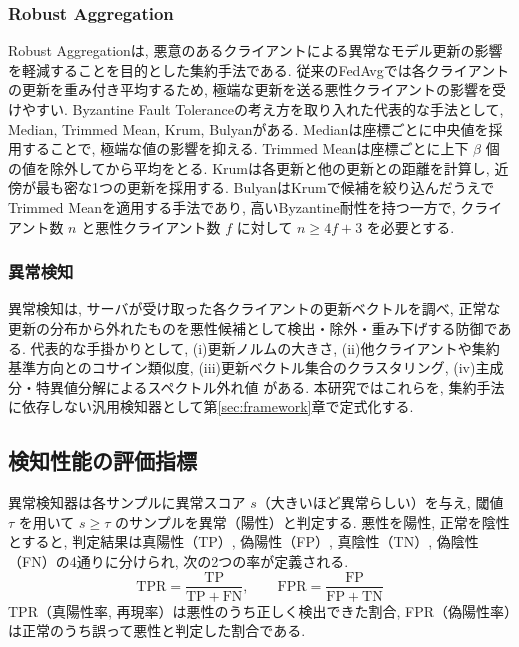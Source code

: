 \documentclass[a4j, twocolumn, dvipdfmx]{jsarticle}
\begin{document}
\subsubsection{Robust Aggregation}
Robust Aggregationは, 悪意のあるクライアントによる異常なモデル更新の影響を軽減することを目的とした集約手法である. 従来のFedAvgでは各クライアントの更新を重み付き平均するため, 極端な更新を送る悪性クライアントの影響を受けやすい. Byzantine Fault Toleranceの考え方を取り入れた代表的な手法として, Median, Trimmed Mean, Krum, Bulyanがある. Median\cite{yin2018byzantine}は座標ごとに中央値を採用することで, 極端な値の影響を抑える. Trimmed Mean\cite{yin2018byzantine}は座標ごとに上下 $\beta$ 個の値を除外してから平均をとる. Krum\cite{blanchard2017krum}は各更新と他の更新との距離を計算し, 近傍が最も密な1つの更新を採用する. Bulyan\cite{elmhamdi2018hidden}はKrumで候補を絞り込んだうえでTrimmed Meanを適用する手法であり, 高いByzantine耐性を持つ一方で, クライアント数 $n$ と悪性クライアント数 $f$ に対して $n \geq 4f+3$ を必要とする.

\subsubsection{異常検知}
異常検知は, サーバが受け取った各クライアントの更新ベクトルを調べ, 正常な更新の分布から外れたものを悪性候補として検出・除外・重み下げする防御である. 代表的な手掛かりとして, (i)更新ノルムの大きさ\cite{nguyen2022flame}, (ii)他クライアントや集約基準方向とのコサイン類似度\cite{nguyen2022flame}, (iii)更新ベクトル集合のクラスタリング\cite{shen2016auror}, (iv)主成分・特異値分解によるスペクトル外れ値\cite{tran2018spectral,shejwalkar2021manipulating} がある. 本研究ではこれらを, 集約手法に依存しない汎用検知器として第\ref{sec:framework}章で定式化する.

\subsection{検知性能の評価指標}
\label{sec:roc-auc}

異常検知器は各サンプルに異常スコア $s$（大きいほど異常らしい）を与え, 閾値 $\tau$ を用いて $s \geq \tau$ のサンプルを異常（陽性）と判定する. 悪性を陽性, 正常を陰性とすると, 判定結果は真陽性（TP）, 偽陽性（FP）, 真陰性（TN）, 偽陰性（FN）の4通りに分けられ, 次の2つの率が定義される.
\begin{equation}
\mathrm{TPR} = \frac{\mathrm{TP}}{\mathrm{TP}+\mathrm{FN}}, \qquad
\mathrm{FPR} = \frac{\mathrm{FP}}{\mathrm{FP}+\mathrm{TN}}
\end{equation}
TPR（真陽性率, 再現率）は悪性のうち正しく検出できた割合, FPR（偽陽性率）は正常のうち誤って悪性と判定した割合である.
\end{document}
